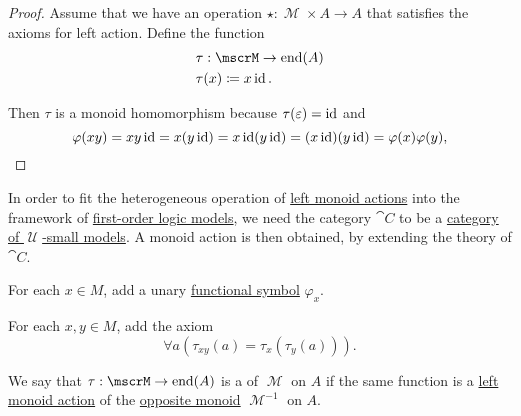 \begin{proof}
   Assume that we have an operation \( \star: \mscrM \times A \to A \) that satisfies the axioms for left action. Define the function
  \begin{align*}
    &\tau: \mscrM \to \End(A) \\
    &\tau(x) \coloneqq x \id.
  \end{align*}

  Then \( \tau \) is a monoid homomorphism because \( \tau(\varepsilon) = \operatorname{id} \) and
  \begin{equation}\label{def:left_monoid_action/homomorphism/proof}
    \varphi(xy)
    =
    xy \operatorname{id}
    =
    x (y \operatorname{id})
    =
    x \operatorname{id} (y \operatorname{id})
    =
    (x \operatorname{id}) (y \operatorname{id})
    =
    \varphi(x) \varphi(y),
  \end{equation}
\end{proof}

\begin{remark}\label{rem:theory_of_left_monoid_actions}
  In order to fit the heterogeneous operation of \hyperref[def:left_monoid_action]{left monoid actions} into the framework of \hyperref[def:first_order_semantics/satisfiability]{first-order logic models}, we need the category \( \cat{C} \) to be a \hyperref[def:category_of_small_first_order_models]{category of \( \mscrU \)-small models}. A monoid action is then obtained, by extending the theory of \( \cat{C} \).

  \begin{thmenum}
     For each \( x \in M \), add a unary \hyperref[def:first_order_language/func]{functional symbol} \( \varphi_x \).

     For each \( x, y \in M \), add the axiom
    \begin{equation}\label{eq:rem:theory_of_left_monoid_actions/axiom_schema}
      \forall a (\tau_{xy}(a) = \tau_x(\tau_y(a))).
    \end{equation}
  \end{thmenum}
\end{remark}

\begin{definition}\label{def:right_monoid_action}
  We say that \( \tau: \mscrM \to \End(A) \) is a  of \( \mscrM \) on \( A \) if the same function is a \hyperref[def:left_monoid_action]{left monoid action} of the \hyperref[def:magma/opposite]{opposite monoid} \( \mscrM^{-1} \) on \( A \).
\end{definition}

